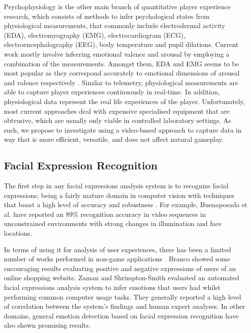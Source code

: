 \documentclass[letterpaper]{article}
\begin{document}
Psychophysiology is the other main branch of quantitative player experience research, which consists of methods to infer psychological states from physiological measurements, that commonly include electrodermal activity (EDA), electromyography (EMG), electrocardiogram (ECG), electroencephalography (EEG), body temperature and pupil dilations. Current work \cite{Mandryk2006,Nacke2008,yannakakis2009real,Nacke2010,Zammitto2010,Drachen2010} mostly involve inferring emotional valence and arousal by employing a combination of the measurements. Amongst them, EDA and EMG seems to be most popular as they correspond accurately to emotional dimensions of arousal and valence respectively \cite{Russell1980}. Similar to telemetry, physiological measurements are able to capture player experiences continuously in real-time. In addition, physiological data represent the real life experiences of the player. Unfortunately, most current approaches deal with expensive specialised equipment that are obtrusive, which are usually only viable in controlled laboratory settings. As such, we propose to investigate using a video-based approach to capture data in way that is more efficient, versatile, and does not affect natural gameplay.

\subsection{Facial Expression Recognition}

The first step in any facial expressions analysis system is to recognize facial expressions; being a fairly mature domain in computer vision with techniques that boast a high level of accuracy and robustness \cite{Bartlett1999,Michel2003,buenaposada2007,McDuff2011}. For example, Buenaposada et al. \citeyear{buenaposada2007} have reported an 89\% recognition accuracy in video sequences in unconstrained environments with strong changes in illumination and face locations.

In terms of using it for analysis of user experiences, there has been a limited number of works performed in non-game applications \cite{Branco2006,Zaman2006}. Branco \citeyear{Branco2006} showed some encouraging results evaluating positive and negative expressions of users of an online shopping website. Zaman and Shrimpton-Smith \citeyear{Zaman2006} evaluated an automated facial expressions analysis system to infer emotions that users had whilst performing common computer usage tasks. They generally reported a high level of correlation between the system's findings and human expert analyses. In other domains, general emotion detection based on facial expression recognition \cite{Ghijsen2004,Baltrusaitis2011} have also shown promising results.  
\end{document}
